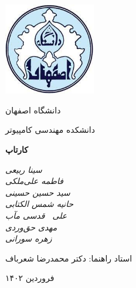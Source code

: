 \documentclass[12pt, oneside]{book}
\begin{document}
    \begin{titlepage}
    	\centering
    	\includegraphics[width=4cm, height=4cm]{logo}\par
        \vspace{2mm}
    	دانشگاه اصفهان \par
        دانشکده مهندسی کامپیوتر \par

    	\vspace{1cm}
    	{\huge \textbf{کارتاپ}\par}
    	\vspace{3cm}
    	{\small\itshape
        سینا ربیعی \\
    	فاطمه علی‌ملکی \\
    	سید حسین حسینی \\
    	حانیه شمس الکتابی \\
    	علی 
    	$\ $
    	قدسی مآب \\
    	مهدی حق‌وردی \\
    	زهره سورانی \par}

    	\vfill
        استاد راهنما:‌ دکتر محمدرضا شعرباف
    	\vfill

    	{\large فروردین ۱۴۰۲\par}
    \end{titlepage}
\end{document}
